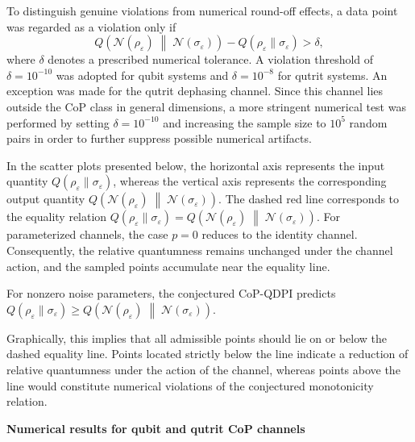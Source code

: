 \documentclass[a4paper, amsfonts, amssymb, amsmath, reprint, showkeys, nofootinbib, twoside, aps, pra]{revtex4-2}
\theoremstyle{definition}
\begin{document}
To distinguish genuine violations from numerical round-off effects, a data point was regarded as a violation only if
\begin{equation}
Q\left( \mathcal N(\rho_\varepsilon) \;\middle\|\; \mathcal N(\sigma_\varepsilon) \right) - Q(\rho_\varepsilon \| \sigma_\varepsilon) > \delta,
\end{equation}
where $\delta$ denotes a prescribed numerical tolerance. A violation threshold of $\delta = 10^{-10}$ was adopted for qubit systems and $\delta = 10^{-8}$ for qutrit systems. An exception was made for the qutrit dephasing channel. Since this channel lies outside the CoP class in general dimensions, a more stringent numerical test was performed by setting $\delta = 10^{-10}$ and increasing the sample size to $10^5$ random pairs in order to further suppress possible numerical artifacts.

In the scatter plots presented below, the horizontal axis represents the input quantity $Q(\rho_\varepsilon \| \sigma_\varepsilon)$, whereas the vertical axis represents the corresponding output quantity $Q\left( \mathcal N(\rho_\varepsilon) \;\middle\|\; \mathcal N(\sigma_\varepsilon) \right)$. The dashed red line corresponds to the equality relation
$
Q(\rho_\varepsilon \| \sigma_\varepsilon) = Q\left( \mathcal N(\rho_\varepsilon) \;\middle\|\; \mathcal N(\sigma_\varepsilon) \right).
$
For parameterized channels, the case $p=0$ reduces to the identity channel. Consequently, the relative quantumness remains unchanged under the channel action, and the sampled points accumulate near the equality line.

For nonzero noise parameters, the conjectured CoP-QDPI predicts $Q(\rho_\varepsilon \| \sigma_\varepsilon) \ge Q\left( \mathcal N(\rho_\varepsilon) \;\middle\|\; \mathcal N(\sigma_\varepsilon) \right)$.

Graphically, this implies that all admissible points should lie on or below the dashed equality line. Points located strictly below the line indicate a reduction of relative quantumness under the action of the channel, whereas points above the line would constitute numerical violations of the conjectured monotonicity relation.



\begin{center}
\textbf{Numerical results for qubit and qutrit CoP channels}
\end{center}
\end{document}
